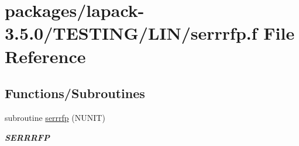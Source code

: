 \hypertarget{serrrfp_8f}{}\section{packages/lapack-\/3.5.0/\+T\+E\+S\+T\+I\+N\+G/\+L\+I\+N/serrrfp.f File Reference}
\label{serrrfp_8f}
\subsection*{Functions/\+Subroutines}
\begin{DoxyCompactItemize}
\item 
subroutine \hyperlink{group__single__lin_ga45472e075e22e5671a95d57eeb243339}{serrrfp} (N\+U\+N\+I\+T)
\begin{DoxyCompactList}\small\item\em {\bfseries S\+E\+R\+R\+R\+F\+P} \end{DoxyCompactList}\end{DoxyCompactItemize}
